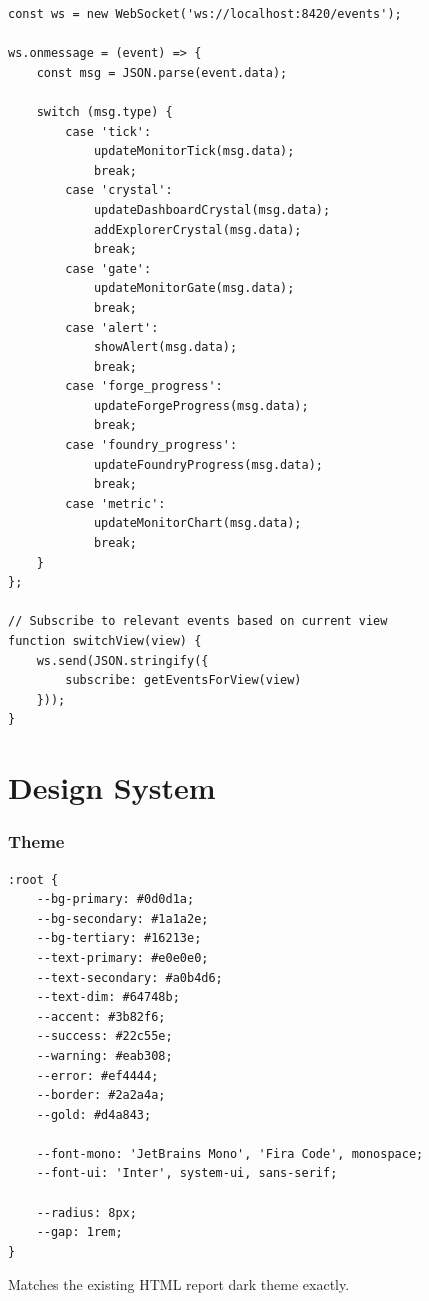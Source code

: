 \documentclass[11pt,a4paper,twoside]{article}
\begin{document}
\begin{lstlisting}[title={Studio WebSocket Client}]
const ws = new WebSocket('ws://localhost:8420/events');

ws.onmessage = (event) => {
    const msg = JSON.parse(event.data);

    switch (msg.type) {
        case 'tick':
            updateMonitorTick(msg.data);
            break;
        case 'crystal':
            updateDashboardCrystal(msg.data);
            addExplorerCrystal(msg.data);
            break;
        case 'gate':
            updateMonitorGate(msg.data);
            break;
        case 'alert':
            showAlert(msg.data);
            break;
        case 'forge_progress':
            updateForgeProgress(msg.data);
            break;
        case 'foundry_progress':
            updateFoundryProgress(msg.data);
            break;
        case 'metric':
            updateMonitorChart(msg.data);
            break;
    }
};

// Subscribe to relevant events based on current view
function switchView(view) {
    ws.send(JSON.stringify({
        subscribe: getEventsForView(view)
    }));
}
\end{lstlisting}


\part{Design System}\label{part:design}

\section{Theme}\label{sec:theme}

\begin{lstlisting}[title={CSS Custom Properties}]
:root {
    --bg-primary: #0d0d1a;
    --bg-secondary: #1a1a2e;
    --bg-tertiary: #16213e;
    --text-primary: #e0e0e0;
    --text-secondary: #a0b4d6;
    --text-dim: #64748b;
    --accent: #3b82f6;
    --success: #22c55e;
    --warning: #eab308;
    --error: #ef4444;
    --border: #2a2a4a;
    --gold: #d4a843;

    --font-mono: 'JetBrains Mono', 'Fira Code', monospace;
    --font-ui: 'Inter', system-ui, sans-serif;

    --radius: 8px;
    --gap: 1rem;
}
\end{lstlisting}

Matches the existing HTML report dark theme exactly.
\end{document}
